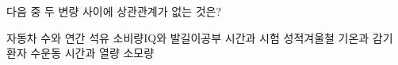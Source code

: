 다음 중 두 변량 사이에 상관관계가 없는 것은?
\begin{choicesv}{자동차 수와 연간 석유 소비량}{IQ와 발길이}{공부 시간과 시험 성적}{겨울철 기온과 감기 환자 수}{운동 시간과 열량 소모량}\end{choicesv}
